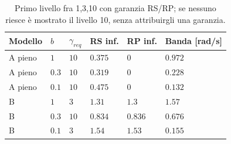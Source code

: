 \begin{table}[htbp]\centering\small
\begin{tabular}{llllll}\toprule
Modello & $b$ & $\gamma_{req}$ & RS inf. & RP inf. & Banda [rad/s]\\\midrule
A pieno & $1$ & $10$ & $0.375$ & $0$ & $0.972$\\
A pieno & $0.3$ & $10$ & $0.319$ & $0$ & $0.228$\\
A pieno & $0.1$ & $10$ & $0.475$ & $0$ & $0.132$\\
B & $1$ & $3$ & $1.31$ & $1.3$ & $1.57$\\
B & $0.3$ & $10$ & $0.834$ & $0.836$ & $0.676$\\
B & $0.1$ & $3$ & $1.54$ & $1.53$ & $0.155$\\
\bottomrule\end{tabular}
\caption{Primo livello fra 1,3,10 con garanzia RS/RP; se nessuno riesce è mostrato il livello 10, senza attribuirgli una garanzia.}
\end{table}
